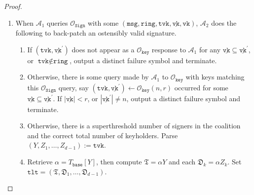\documentclass[11pt]{article}
\theoremstyle{definition}
\newcommand{\vk}{\texttt{vk}}
\newcommand{\tlt}{\texttt{tlt}}
\newcommand{\tvk}{\texttt{tvk}}
\newcommand{\ring}{\texttt{ring}}
\newcommand{\VK}{\underline{\texttt{vk}}}
\newcommand{\msg}{\texttt{msg}}
\newcommand{\sign}{\texttt{Sign}}
\newcommand{\signingOracle}{\mathcal{O}_{\sign}}
\newcommand{\keyOracle}{\mathcal{O}_{\texttt{key}}}
\begin{document}
\begin{proof}
\begin{enumerate}
\begin{enumerate}
\item When $\mathcal{A}_1$ queries $\signingOracle$ with some $(\msg, \ring, \tvk, \VK, \vk)$, $\mathcal{A}_2$ does the following to back-patch an ostensibly valid signature.
\begin{enumerate}
\item If $(\tvk, \VK^\prime)$ does not appear as a $\keyOracle$ response to $\mathcal{A}_1$ for any $\VK \subseteq \VK^\prime$, or $\tvk \notin \ring$, output a distinct failure symbol and terminate.
\item Otherwise, there is some query made by $\mathcal{A}_1$ to $\keyOracle$ with keys matching this $\signingOracle$ query, say $(\tvk, \VK^\prime) \leftarrow \keyOracle(n,r)$ occurred for some $\VK \subseteq \VK^\prime$. If $\left|\VK\right| < r$, or $\left|\VK^\prime\right| \neq n$, output a distinct failure symbol and terminate.  
\item Otherwise, there is a superthreshold number of signers in the coalition and the correct total number of keyholders. Parse $(Y, Z_1, \ldots, Z_{d-1}) := \tvk$.
\item Retrieve $\alpha = T_{\texttt{base}}[Y]$, then compute $\mathfrak{T} = \alpha Y$ and each $\mathfrak{D}_k = \alpha Z_k$. Set $\tlt = (\mathfrak{T}, \mathfrak{D}_1, \ldots, \mathfrak{D}_{d-1})$.


\end{enumerate}
\end{enumerate}
\end{enumerate}
\end{proof}
\end{document}
